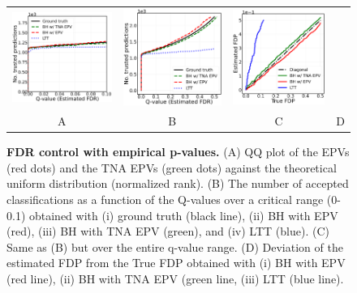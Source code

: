 \documentclass{article}
\begin{document}
\begin{figure}[h!]
\begin{tabular}{cccc}
		\includegraphics[width=1.72in]{img/cnn_balanced_fdr_control_loc.png} &
		\includegraphics[width=1.7in]{img/cnn_balanced_fdr_control.png} & 
		\includegraphics[width=1.59in]{img/cnn_FDPscat_balanced.png} \\		
		A & B & C & D \\
	\end{tabular}
	\caption{{\bf  FDR control with empirical p-values.}
		(A) QQ plot of the EPVs (red dots) and the TNA EPVs (green dots) against the theoretical uniform distribution (normalized rank). (B) The number of accepted classifications as a function of the Q-values over a critical range (0-0.1) obtained with (i) ground truth (black line), (ii) BH with EPV (red), (iii) BH with TNA EPV (green), and (iv) LTT (blue). (C) Same as (B) but over the entire q-value range. (D) Deviation of the estimated FDP from the True FDP obtained with (i) BH with EPV (red line), (ii) BH with TNA EPV  (green line, (iii) LTT (blue line).}
	\label{fig:mnist_shfit}
\end{figure}

	
\end{document}
